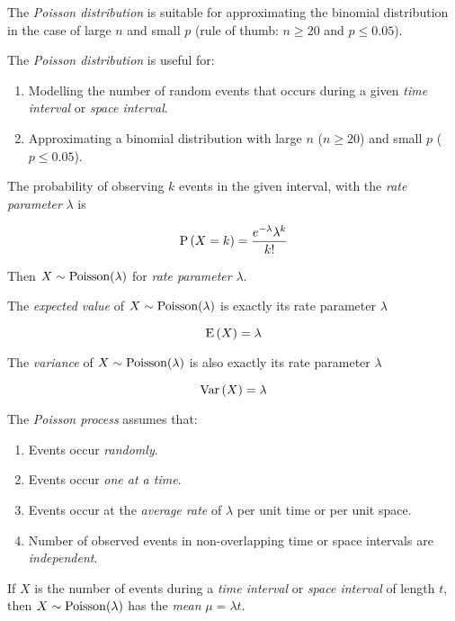 \begin{remark}
    The \textit{Poisson distribution} is suitable for approximating the
    binomial distribution in the case of large $n$ and small $p$ (rule of
    thumb: $n \ge 20$ and $p \le 0.05$).
\end{remark}

\begin{definition}
    The \textit{Poisson distribution} is useful for:

    \begin{enumerate}
        \item Modelling the number of random events that occurs during a given
            \textit{time interval} or \textit{space interval}.
        \item Approximating a binomial distribution with large $n$ ($n \ge 20$)
            and small $p$ ($p \le 0.05$).
    \end{enumerate}

    The probability of observing $k$ events in the given interval, with the
    \textit{rate parameter} $\lambda$ is

    \begin{equation}
        \mathrm{P} \left( X = k \right) = \frac{e^{-\lambda} \lambda^k}{k!}
    \end{equation}

    Then $X \sim \mathrm{Poisson}(\lambda)$ for \textit{rate parameter} $\lambda$.

    The \textit{expected value} of $X \sim \mathrm{Poisson}(\lambda)$ is exactly its
    rate parameter $\lambda$

    \begin{equation}
        \mathrm{E} \left( X \right) = \lambda
    \end{equation}

    The \textit{variance} of $X \sim \mathrm{Poisson}(\lambda)$ is also exactly its
    rate parameter $\lambda$

    \begin{equation}
        \mathrm{Var} \left( X \right) = \lambda
    \end{equation}
\end{definition}

\begin{definition}
    The \textit{Poisson process} assumes that:

    \begin{enumerate}
        \item Events occur \textit{randomly}.
        \item Events occur \textit{one at a time}.
        \item Events occur at the \textit{average rate} of $\lambda$ per unit time or per unit space.
        \item Number of observed events in non-overlapping time or space intervals are \textit{independent}.
    \end{enumerate}

    If $X$ is the number of events during a \textit{time interval} or \textit{space interval} of length $t$, then $X \sim \mathrm{Poisson}(\lambda)$ has the \textit{mean} $\mu = \lambda t$.
\end{definition}

